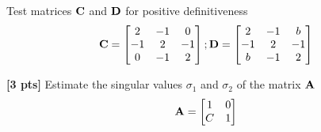 \documentclass[11pt,addpoints,answers]{exam}
\numberwithin{equation}{section} %
\numberwithin{figure}{section} %
\numberwithin{table}{section} %
\begin{document}
\begin{questions}
    Test matrices $\mathbf{C}$ and $\mathbf{D}$ for positive definitiveness
    \begin{align*}
        \mathbf{C}=\begin{bmatrix}
                 2 & -1 & 0 \\
                 -1 & 2 & -1 \\
                 0 & -1 & 2
                \end{bmatrix};
        \mathbf{D}=\begin{bmatrix}
                 2 & -1 & b \\
                 -1 & 2 & -1 \\
                 b & -1 & 2
                \end{bmatrix}
    \end{align*}
    \begin{tcolorbox}[fit,height=3cm, width=\textwidth, blank, borderline={0.5pt}{-2pt},halign=center, valign=center, nobeforeafter]
    \end{tcolorbox}




    \question \textbf{[3 pts]}   Estimate the singular values $\sigma_1$ and $\sigma_2$ of the matrix $\mathbf{A}$
    \begin{align*}
        \mathbf{A} = \begin{bmatrix}
            1 & 0 \\ C & 1
        \end{bmatrix}
    \end{align*}


\end{questions}
\end{document}
